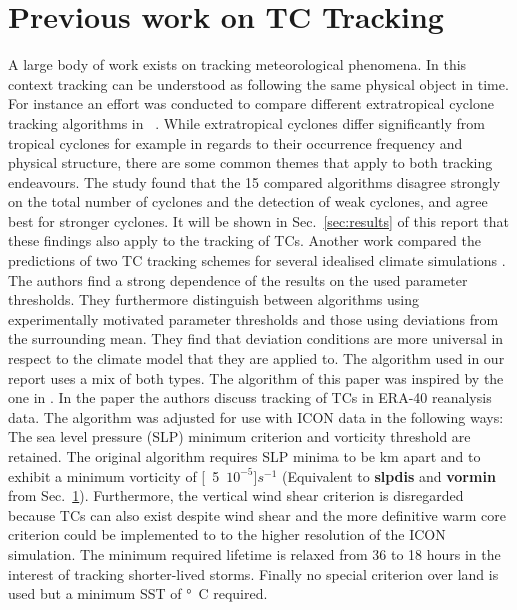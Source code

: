 \section{Previous work on TC Tracking}\label{sec:tracking}
A large body of work exists on tracking meteorological phenomena. In this context tracking can be understood as following the same physical object in time.\newline
For instance an effort was conducted to compare different extratropical cyclone tracking algorithms in ~\cite{extratropical}. While extratropical cyclones differ significantly from tropical cyclones for example in regards to their occurrence frequency and physical structure, there are some common themes that apply to both tracking endeavours. The study found that the 15 compared algorithms disagree strongly on the total number of cyclones and the detection of weak cyclones, and agree best for stronger cyclones. It will be shown in Sec.~\ref{sec:results} of this report that these findings also apply to the tracking of TCs.\newline
Another work compared the predictions of two TC tracking schemes for several idealised climate simulations \cite{comp-climate-schemes}. The authors find a strong dependence of the results on the used parameter thresholds. They furthermore distinguish between algorithms using experimentally motivated parameter thresholds and those using deviations from the surrounding mean. They find that deviation conditions are more universal in respect to the climate model that they are applied to. The algorithm used in our report uses a mix of both types.\newline
The algorithm of this paper was inspired by the one in \cite{orig-tracking}. In the paper the authors discuss tracking of TCs in ERA-40 reanalysis data. The algorithm was adjusted for use with ICON data in the following ways: The sea level pressure (SLP) minimum criterion and vorticity threshold are retained. The original algorithm requires SLP minima to be \unit[250]{km} apart and to exhibit a minimum vorticity of \unit[5\times $10^{-5}$]{$s^{-1}$} (Equivalent to \textbf{slpdis} and \textbf{vormin} from Sec.~\ref{sec:tracking}). Furthermore, the vertical wind shear criterion is disregarded because TCs can also exist despite wind shear and the more definitive warm core criterion could be implemented to to the higher resolution of the ICON simulation. The minimum required lifetime is relaxed from 36 to 18 hours in the interest of tracking shorter-lived storms. Finally no special criterion over land is used but a minimum SST of \unit[24]{\degree C} required.
